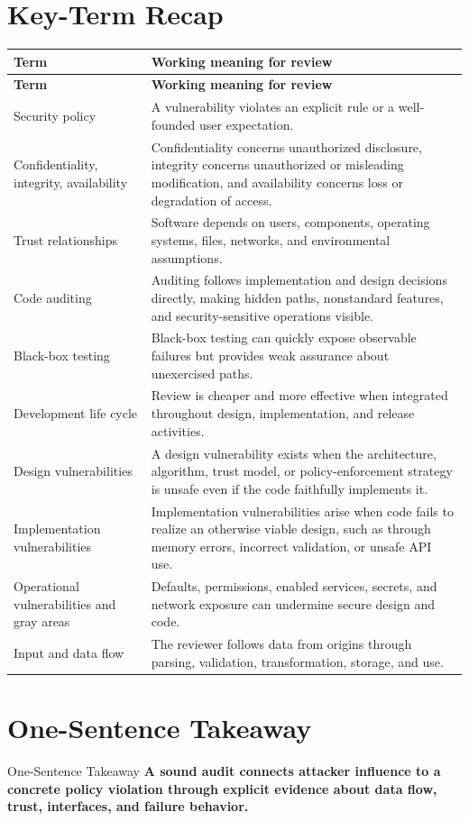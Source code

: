 \documentclass[11pt,letterpaper]{article}
\begin{document}
\section{Key-Term Recap}
\begin{longtable}{>{\raggedright\arraybackslash}p{}p{}}
\toprule
\textbf{Term} & \textbf{Working meaning for review} \\
\midrule
\endfirsthead
\toprule
\textbf{Term} & \textbf{Working meaning for review} \\
\midrule
\endhead
Security policy & A vulnerability violates an explicit rule or a well-founded user expectation. \\
Confidentiality, integrity, availability & Confidentiality concerns unauthorized disclosure, integrity concerns unauthorized or misleading modification, and availability concerns loss or degradation of access. \\
Trust relationships & Software depends on users, components, operating systems, files, networks, and environmental assumptions. \\
Code auditing & Auditing follows implementation and design decisions directly, making hidden paths, nonstandard features, and security-sensitive operations visible. \\
Black-box testing & Black-box testing can quickly expose observable failures but provides weak assurance about unexercised paths. \\
Development life cycle & Review is cheaper and more effective when integrated throughout design, implementation, and release activities. \\
Design vulnerabilities & A design vulnerability exists when the architecture, algorithm, trust model, or policy-enforcement strategy is unsafe even if the code faithfully implements it. \\
Implementation vulnerabilities & Implementation vulnerabilities arise when code fails to realize an otherwise viable design, such as through memory errors, incorrect validation, or unsafe API use. \\
Operational vulnerabilities and gray areas & Defaults, permissions, enabled services, secrets, and network exposure can undermine secure design and code. \\
Input and data flow & The reviewer follows data from origins through parsing, validation, transformation, storage, and use. \\
\bottomrule
\end{longtable}
\section{One-Sentence Takeaway}
\begin{CornellExamBox}{One-Sentence Takeaway}
\textbf{A sound audit connects attacker influence to a concrete policy violation through explicit evidence about data flow, trust, interfaces, and failure behavior.}
\end{CornellExamBox}
\end{document}
